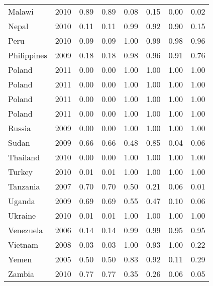 \begin{longtable}[t]{lrrrrrrr}
Malawi & 2010 & 0.89 & 0.89 & 0.08 & 0.15 & 0.00 & 0.02\\
Nepal & 2010 & 0.11 & 0.11 & 0.99 & 0.92 & 0.90 & 0.15\\
Peru & 2010 & 0.09 & 0.09 & 1.00 & 0.99 & 0.98 & 0.96\\
Philippines & 2009 & 0.18 & 0.18 & 0.98 & 0.96 & 0.91 & 0.76\\
Poland & 2011 & 0.00 & 0.00 & 1.00 & 1.00 & 1.00 & 1.00\\
Poland & 2011 & 0.00 & 0.00 & 1.00 & 1.00 & 1.00 & 1.00\\
Poland & 2011 & 0.00 & 0.00 & 1.00 & 1.00 & 1.00 & 1.00\\
Poland & 2011 & 0.00 & 0.00 & 1.00 & 1.00 & 1.00 & 1.00\\
Russia & 2009 & 0.00 & 0.00 & 1.00 & 1.00 & 1.00 & 1.00\\
Sudan & 2009 & 0.66 & 0.66 & 0.48 & 0.85 & 0.04 & 0.06\\
Thailand & 2010 & 0.00 & 0.00 & 1.00 & 1.00 & 1.00 & 1.00\\
Turkey & 2010 & 0.01 & 0.01 & 1.00 & 1.00 & 1.00 & 1.00\\
Tanzania & 2007 & 0.70 & 0.70 & 0.50 & 0.21 & 0.06 & 0.01\\
Uganda & 2009 & 0.69 & 0.69 & 0.55 & 0.47 & 0.10 & 0.06\\
Ukraine & 2010 & 0.01 & 0.01 & 1.00 & 1.00 & 1.00 & 1.00\\
Venezuela & 2006 & 0.14 & 0.14 & 0.99 & 0.99 & 0.95 & 0.95\\
Vietnam & 2008 & 0.03 & 0.03 & 1.00 & 0.93 & 1.00 & 0.22\\
Yemen & 2005 & 0.50 & 0.50 & 0.83 & 0.92 & 0.11 & 0.29\\
Zambia & 2010 & 0.77 & 0.77 & 0.35 & 0.26 & 0.06 & 0.05\\
\bottomrule
\end{longtable}
